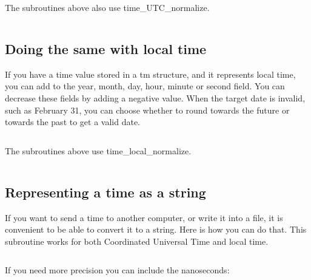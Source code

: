 \documentclass[letterpaper,twoside]{article}
\begin{document}
The subroutines above also use time\_UTC\_normalize.
\inputminted[firstline=32]{c}{src/time_utc_normalize.c}

\subsection{Doing the same with local time}
\label{subsection:timelocaladd}
If you have a time value stored in a {\ttfamily tm} structure, and it represents
local time, you can add to the year, month, day, hour, minute or
second field.  You can decrease these fields by adding a negative
value.  When the target date is invalid, such as February 31,
you can choose whether to round towards the future or towards the past
to get a valid date.
\inputminted[firstline=32]{c}{src/time_local_add.c}
The subroutines above use time\_local\_normalize.
\inputminted[firstline=32]{c}{src/time_local_normalize.c}

\subsection{Representing a time as a string}
\label{subsection:tostring}
If you want to send a time to another computer, or write it into a file,
it is convenient to be able to convert it to a string.  Here is how you
can do that.  This subroutine works for both Coordinated Universal Time
and local time.
\inputminted[firstline=34]{c}{src/time_tm_to_string.c}

If you need more precision you can include the nanoseconds:
\inputminted[firstline=34]{c}{src/time_tm_nano_to_string.c}
\end{document}
